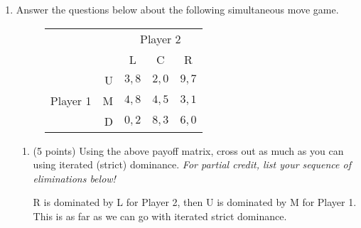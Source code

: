 \documentclass[twoside]{article}
\newcommand{\mybigskip}{\vspace{1in}}
\begin{document}
\begin{enumerate}
\begin{enumerate}
\begin{KEY}
The Nash equilibrium is not a Pareto improvement because (M, R) has a payoff of (5, 10). \end{KEY}
 
    \end{enumerate}






\begin{EXAM}\clearpage\end{EXAM}

\item Answer the questions below about the following simultaneous move game.

    \begin{figure}[h]
    \begin{center}
    \begin{tabular}{crccc}
    & & \multicolumn{3}{c}{Player 2} \\ [.15cm]
    & & L & C & R \\ \cline{3-5}
    \multirow{3}{1.5cm}{Player 1} 
    & U & \multicolumn{1}{|c|}{$3, 8$} & \multicolumn{1}{c}{$2, 0$} & \multicolumn{1}{|c|}{$9, 7$} \\ \cline{3-5}
    & M & \multicolumn{1}{|c|}{$4, 8$} & \multicolumn{1}{c}{$4, 5$} & \multicolumn{1}{|c|}{$3, 1$} \\ \cline{3-5}
    & D & \multicolumn{1}{|c|}{$0, 2$} & \multicolumn{1}{c}{$8, 3$} & \multicolumn{1}{|c|}{$6, 0$} \\ \cline{3-5}
    \end{tabular}
    \end{center}
    \end{figure}


    \begin{enumerate}
    \item (5 points) Using the above payoff matrix, cross out as much as you can using iterated (strict) dominance. \emph{For partial credit, list your sequence of eliminations below!}
    \begin{EXAM}\mybigskip\end{EXAM}
    
\begin{KEY}
R is dominated by L for Player 2, then U is dominated by M for Player 1. This is as far as we can go with iterated strict dominance.
\end{KEY}


\end{enumerate}
\end{enumerate}
\end{document}
